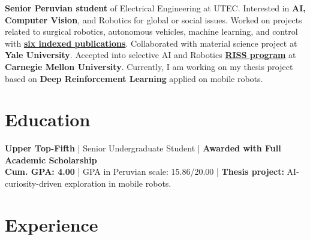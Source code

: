 \documentclass[]{resume-openfont}
\begin{document}
\begin{minipage}[t]{0.95\linewidth} 
\textbf{Senior Peruvian student} of Electrical Engineering at UTEC. Interested in \textbf{AI,  Computer Vision}, and Robotics for global or social issues. Worked on projects related to surgical robotics, autonomous vehicles, machine learning, and control with \href{https://scholar.google.com/citations?user=KjixlLsAAAAJ&hl=es&oi=ao}{\textbf{six indexed publications}}. Collaborated with material science project at \textbf{Yale University}. Accepted into selective AI and Robotics  
\href{https://riss.ri.cmu.edu/}{\textbf{RISS program}} at \textbf{Carnegie Mellon University}. Currently, I am working on my thesis project based on \textbf{Deep Reinforcement Learning} applied on mobile robots.

\section{Education} 
\textbf{Upper Top-Fifth} | Senior Undergraduate Student |
\textbf{Awarded with Full Academic Scholarship} \\
\textbf{Cum. GPA: 4.00} | GPA in Peruvian scale: 15.86/20.00 | \textbf{Thesis project:} AI-curiosity-driven exploration in mobile robots.


\section{Experience}


\end{minipage}
\end{document}
